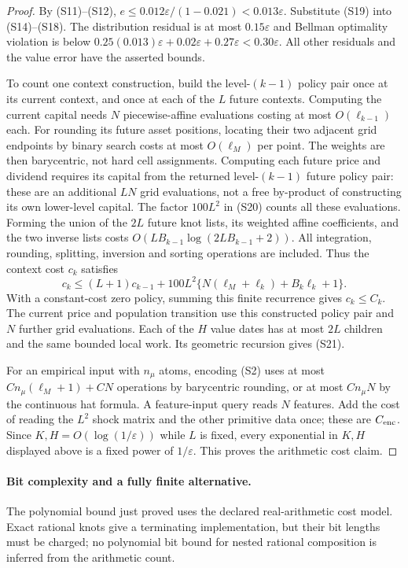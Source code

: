 \documentclass[11pt,a4paper]{article}
\begin{document}
\begin{proof}
By \textup{(S11)--(S12)},
$e\leq0.012\varepsilon/(1-0.021)<0.013\varepsilon$.
Substitute \textup{(S19)} into \textup{(S14)--(S18)}. The distribution
residual is at most $0.15\varepsilon$ and Bellman optimality violation
is below
$0.25(0.013)\varepsilon+0.02\varepsilon+0.27\varepsilon
<0.30\varepsilon$. All other residuals and the value error have
the asserted bounds.

To count one context construction, build the level-$(k-1)$ policy
pair once at its current context, and once at each of the $L$ future
contexts. Computing the current capital needs $N$ piecewise-affine
evaluations costing at most $O(\ell_{k-1})$ each. For rounding its
future asset positions, locating their two adjacent grid endpoints
by binary search costs at most $O(\ell_M)$ per point. The weights
are then barycentric, not hard cell assignments. Computing each
future price and dividend requires its capital from the returned
level-$(k-1)$ future policy pair: these are an additional $LN$
grid evaluations, not a free by-product of constructing its own
lower-level capital. The factor $100L^2$ in \textup{(S20)} counts
all these evaluations. Forming the union
of the $2L$ future knot lists, its weighted affine coefficients,
and the two inverse lists costs
$O(L B_{k-1}\log(2L B_{k-1}+2))$. All integration, rounding,
splitting, inversion and sorting operations are included.
Thus the context cost $c_k$ satisfies
\[
 c_k\leq(L+1)c_{k-1}
 +100L^2\{N(\ell_M+\ell_k)+B_k\ell_k+1\}.
\]
With a constant-cost zero policy, summing this finite recurrence
gives $c_k\leq C_k$. The current price and population transition
use this constructed policy pair and $N$ further grid evaluations.
Each of the $H$ value dates has at most $2L$ children and the same
bounded local work. Its geometric recursion gives \textup{(S21)}.

For an empirical input with $n_\mu$ atoms, encoding \textup{(S2)}
uses at most $C n_\mu(\ell_M+1)+CN$ operations by barycentric
rounding, or at most $Cn_\mu N$ by the continuous hat formula.
A feature-input query reads $N$ features. Add the cost of reading
the $L^2$ shock matrix and the other primitive data once; these
are $C_{\rm enc}$. Since $K,H=O(\log(1/\varepsilon))$ while $L$
is fixed, every exponential in $K,H$ displayed above is a fixed
power of $1/\varepsilon$. This proves the arithmetic cost claim.
\end{proof}

\paragraph{Bit complexity and a fully finite alternative.}
The polynomial bound just proved uses the declared real-arithmetic
cost model. Exact rational knots give a terminating implementation,
but their bit lengths must be charged; no polynomial bit bound for
nested rational composition is inferred from the arithmetic count.
\end{document}
